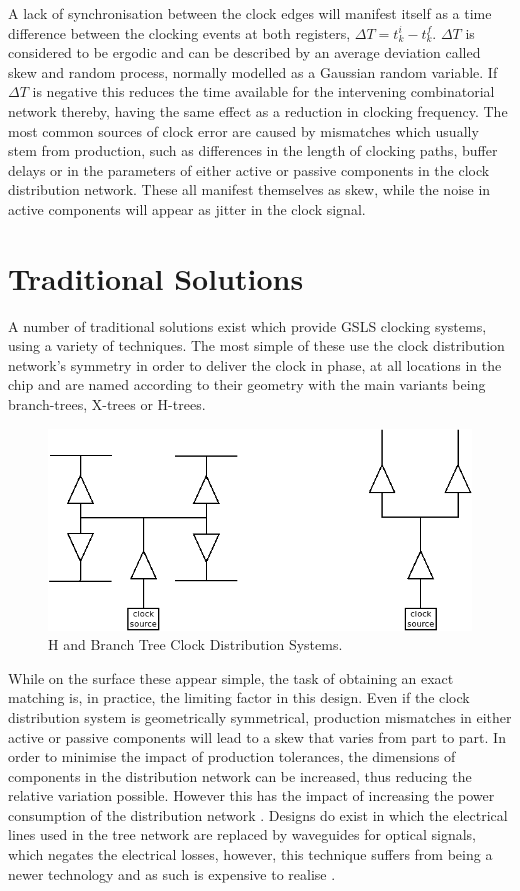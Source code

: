 \documentclass[11pt,english,british]{report}
\begin{document}
A lack of synchronisation between the clock edges will manifest itself as a time difference between the clocking events at both registers, $\Delta T = t^i_k - t^f_k$. $\Delta T$ is considered to be ergodic and can be described by an average deviation called skew and random process, normally modelled as a Gaussian random variable. If $\Delta T$ is negative this reduces the time available for the intervening combinatorial network thereby, having the same effect as a reduction in clocking frequency.
The most common sources of clock error are caused by mismatches which usually stem from production, such as differences in the length of clocking paths, buffer delays or in the parameters of either active or passive components in the clock distribution network. These all manifest themselves as skew, while the noise in active components will appear as jitter in the clock signal.

\section{Traditional Solutions}
A number of traditional solutions exist which provide GSLS clocking systems, using a variety of techniques. The most simple of these use the clock distribution network's symmetry in order to deliver the clock in phase, at all locations in the chip and are named according to their geometry with the main variants being branch-trees, X-trees or H-trees. 
\begin{figure}[h]
	\centering
	\includegraphics[scale=0.2]{../trees}
	\caption{H and Branch Tree Clock Distribution Systems.}
	\label{fig:trees}
\end{figure}

While on the surface these appear simple, the task of obtaining an exact matching is, in practice, the limiting factor in this design. Even if the clock distribution system is geometrically symmetrical, production mismatches in either active or passive components will lead to a skew that varies from part to part. In order to minimise the impact of production tolerances, the dimensions of components in the distribution network can be increased, thus reducing the relative variation possible. However this has the impact of increasing the power consumption of the distribution network \cite{tiwari1998reducing}.
Designs do exist in which the electrical lines used in the tree network are replaced by waveguides for optical signals, which negates the electrical losses, however, this technique suffers from being a newer technology and as such is expensive to realise \cite{haurylau2006chip}.
\end{document}

